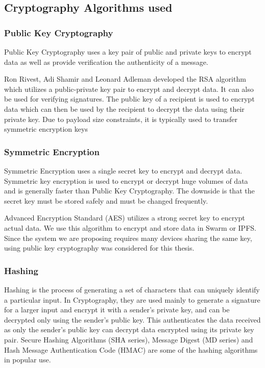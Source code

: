 \documentclass[11pt,openright]{report}
\begin{document}
\subsection{Cryptography Algorithms used}
\subsubsection{Public Key Cryptography}
Public Key Cryptography uses a key pair of public and private keys to encrypt data as well as provide verification the authenticity of a message.

Ron Rivest, Adi Shamir and Leonard Adleman developed the RSA algorithm which utilizes a public-private key pair to encrypt and decrypt data. It can also be used for verifying signatures. The public key of a recipient is used to encrypt data which can then be used by the recipient to decrypt the data using their private key. Due to payload size constraints, it is typically used to transfer symmetric encryption keys

\subsubsection{Symmetric Encryption}
Symmetric Encryption uses a single secret key to encrypt and decrypt data. Symmetric key encryption is used to encrypt or decrypt huge volumes of data and is generally faster than Public Key Cryptography. The downside is that the secret key must be stored safely and must be changed frequently.

Advanced Encryption Standard (AES) utilizes a strong secret key to encrypt actual data. We use this algorithm to encrypt and store data in Swarm or IPFS. Since the system we are proposing requires many devices sharing the same key, using public key cryptography was considered for this thesis.  
\subsubsection{Hashing}
Hashing is the process of generating a set of characters that can uniquely identify a particular input. In Cryptography, they are used mainly to generate a signature for a larger input and encrypt it with a sender's private key, and can be decrypted only using the sender's public key. This authenticates the data received as only the sender's public key can decrypt data encrypted using its private key pair. Secure Hashing Algorithms (SHA series), Message Digest (MD series) and Hash Message Authentication Code (HMAC) are some of the hashing algorithms in popular use.
\end{document}
